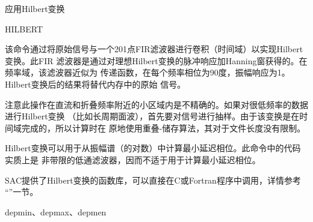 \label{cmd:hilbert}

应用Hilbert变换

\begin{SACSTX}
HILBERT
\end{SACSTX}

该命令通过将原始信号与一个201点FIR滤波器进行卷积（时间域）以实现Hilbert变换。此FIR
滤波器是通过对理想Hilbert变换的脉冲响应加Hanning窗获得的。在频率域，该滤波器近似为
传递函数，在每个频率相位为90度，振幅响应为1。Hilbert变换后的结果将替代内存中的原始
信号。

注意此操作在直流和折叠频率附近的小区域内是不精确的。如果对很低频率的数据进行Hilbert变换
（比如长周期面波），首先要对信号进行抽样。由于该变换是在时间域完成的，所以计算时在
原地使用重叠-储存算法，其对于文件长度没有限制。

Hilbert变换可以用于从振幅谱（的对数）中计算最小延迟相位。此命令中的代码实质上是
非带限的低通滤波器，因而不适于用于计算最小延迟相位。

SAC提供了Hilbert变换的函数库，可以直接在C或Fortran程序中调用，详情参考
``''一节。

depmin、depmax、depmen
